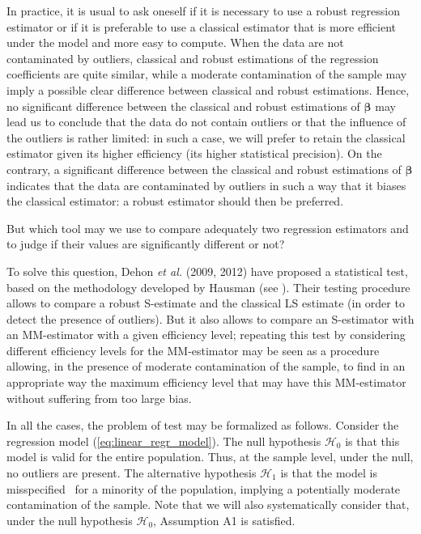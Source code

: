 In practice, it is usual to ask oneself if it is necessary to use a robust
regression estimator or if it is preferable to use a classical estimator that
is more efficient under the model and more easy to compute. When the data are
not contaminated by outliers, classical and robust estimations of the
regression coefficients are quite similar, while a moderate contamination of
the sample may imply a possible clear difference between classical and robust
estimations. Hence, no significant difference between the classical and robust
estimations of $\boldsymbol\beta$ may lead us to conclude that the data do
not contain outliers or that the influence of the outliers is rather limited:
in such a case, we will prefer to retain the classical estimator given its
higher efficiency (its higher statistical precision). On the contrary, a
significant difference between the classical and robust estimations of
$\boldsymbol\beta$ indicates that the data are contaminated by outliers in
such a way that it biases the classical estimator: a robust estimator should
then be preferred.

But which tool may we use to compare adequately two regression estimators and
to judge if their values are significantly different or not?

To solve this question, Dehon \textit{et al.} (2009, 2012) have proposed a
statistical test, based on the methodology developed by Hausman (see
\citealp{Hausman:1978}). Their testing procedure allows to compare a robust
S-estimate and the classical LS estimate (in order to detect the presence of
outliers). But it also allows to compare an S-estimator with an MM-estimator
with a given efficiency level; repeating this test by considering different
efficiency levels for the MM-estimator may be seen as a procedure allowing, in
the presence of moderate contamination of the sample, to find in an
appropriate way the maximum efficiency level that may have this MM-estimator
without suffering from too large bias.

In all the cases, the problem of test may be formalized as follows. Consider
the regression model (\ref{eq:linear_regr_model}). The null hypothesis
$\mathcal{H}_{0}$ is that this model is valid for the entire population. Thus,
at the sample level, under the null, no outliers are present. The alternative
hypothesis $\mathcal{H}_{1}$ is that the model is misspecified \ for a
minority of the population, implying a potentially moderate contamination of
the sample. Note that we will also systematically consider that, under the
null hypothesis $\mathcal{H}_{0}$, Assumption A1 is satisfied.


